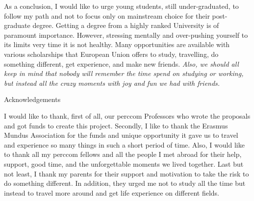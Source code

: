 \documentclass[10pt,a4paper]{article} %
\newcommand{\NewsItem}[1]{ %
\usefont{T1}{fvs}{n}{n} %
\vspace{24pt}\large #1\vspace{3pt} %
\par \normalsize \normalfont}
\begin{document}
\begin{multicols}{3}
As a conclusion, I would like to urge young students, still under-graduated, to 
follow my path and not to focus only on mainstream choice for their post-graduate 
degree. 
Getting a degree from a highly ranked University is of paramount importance. 
However, stressing mentally and over-pushing yourself to its limits very time 
it is not healthy. 
Many opportunities are available with various scholarships that European Union 
offers to study, travelling, do something different, get experience, and make 
new friends.
\textit{Also, we should all keep in mind that nobody will remember the time spend on studying 
or working, but instead all the crazy moments with joy and fun we had with friends.}

 
 
\NewsItem{Acknowledgements}

I would like to  thank, first of all, our {\sc perccom} Professors who wrote the 
proposals and got funds to create this project. 
Secondly, I like to thank the Erasmus Mundus Association for the funds and unique 
opportunity it gave us to travel and experience so many things in such a short 
period of time. 
Also, I would like to thank all my {\sc perccom} fellows and all the people I met 
abroad for their help, support, 
good time, and the unforgettable moments we lived together. 
Last but not least, I thank my parents for their support and motivation to take the 
risk to do something different. 
In addition, they urged me not to study all the time but instead to travel more 
around and get life experience on different fields.

\end{multicols}
\end{document}
